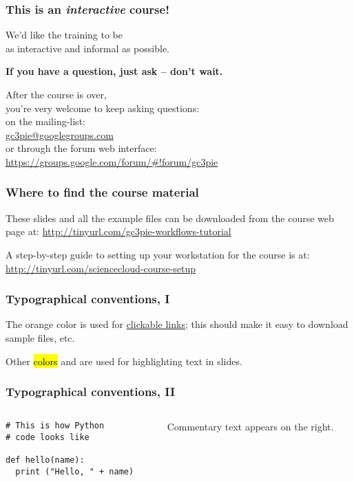 \documentclass[english,serif,mathserif,xcolor=pdftex,dvipsnames,table]{beamer}
\begin{document}
\begin{frame}
  \frametitle{This is an \emph{interactive} course!}
  \begin{center}
    We'd like the training to be \\ as interactive and informal as
    possible.

    \+ \textbf{If you have a question, just ask -- don't wait.}

    \+
    After the course is over, \\ you're very welcome to keep asking questions:
    \\[1ex]
    on the mailing-list: \\
    \href{mailto:gc3pie@googlegroups.com}{gc3pie@googlegroups.com}
    \\[1ex]
    or through the forum web interface: \\ {\small
      \url{https://groups.google.com/forum/\#!forum/gc3pie}}
  \end{center}
\end{frame}


\begin{frame}
  \frametitle{Where to find the course material}

  These slides and all the example files can be downloaded from the
  course web page at:
  {\small\url{http://tinyurl.com/gc3pie-workflows-tutorial}}

  \+
  A step-by-step guide to setting up your workstation for the course is at:
  {\small\url{http://tinyurl.com/sciencecloud-course-setup}}
\end{frame}


\begin{frame}
  \frametitle{Typographical conventions, I}

  The orange color is used for
  \href{http://tinyurl.com/gc3pie-july-2016}{clickable
    links}; this should make it easy to download sample files, etc.

  \+
  Other \hl{colors} and  are used for highlighting
  text in slides.
\end{frame}


\begin{frame}[fragile]
  \frametitle{Typographical conventions, II}

    \begin{columns}[t]
    \begin{column}{0.5\textwidth}
\begin{lstlisting}
# This is how Python
# code looks like

def hello(name):
  print ("Hello, " + name)
\end{lstlisting}
    \end{column}
    \begin{column}{0.5\textwidth}
      \raggedleft Commentary text appears on the right.
    \end{column}
  \end{columns}
\end{frame}
\end{document}
